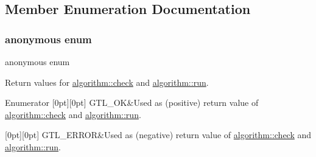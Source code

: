 \subsection{Member Enumeration Documentation}
\mbox{\label{classalgorithm_af1a0078e153aa99c24f9bdf0d97f6710}} 
\subsubsection{\texorpdfstring{anonymous enum}{anonymous enum}}
{\footnotesize\ttfamily anonymous enum\hspace{0.3cm}{\ttfamily [inherited]}}



Return values for \mbox{\hyperlink{classalgorithm_a76361fb03ad1cf643affc51821e43bed}{algorithm\+::check}} and \mbox{\hyperlink{classalgorithm_a734b189509a8d6b56b65f8ff772d43ca}{algorithm\+::run}}. 

\begin{DoxyEnumFields}{Enumerator}
[0pt][0pt]{}\mbox{\label{classalgorithm_af1a0078e153aa99c24f9bdf0d97f6710a5114c20e4a96a76b5de9f28bf15e282b}} 
G\+T\+L\+\_\+\+OK&Used as (positive) return value of \mbox{\hyperlink{classalgorithm_a76361fb03ad1cf643affc51821e43bed}{algorithm\+::check}} and \mbox{\hyperlink{classalgorithm_a734b189509a8d6b56b65f8ff772d43ca}{algorithm\+::run}}. \\
\hline

[0pt][0pt]{}\mbox{\label{classalgorithm_af1a0078e153aa99c24f9bdf0d97f6710a6fcf574690bbd6cf710837a169510dd7}} 
G\+T\+L\+\_\+\+E\+R\+R\+OR&Used as (negative) return value of \mbox{\hyperlink{classalgorithm_a76361fb03ad1cf643affc51821e43bed}{algorithm\+::check}} and \mbox{\hyperlink{classalgorithm_a734b189509a8d6b56b65f8ff772d43ca}{algorithm\+::run}}. \\
\hline

\end{DoxyEnumFields}



